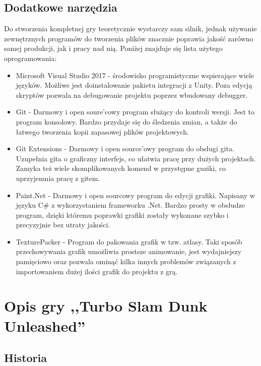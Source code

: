 \documentclass[a4paper,12pt,twoside,openany]{report}
\begin{document}
\section{Dodatkowe narzędzia}
Do stworzenia kompletnej gry teoretycznie wystarczy sam silnik, jednak używanie zewnętrznych programów do tworzenia plików znacznie poprawia jakość zarówno samej produkcji, jak i pracy nad nią. Poniżej znajduje się lista użytego oprogramowania:

\begin{itemize}
    \item Microsoft Visual Studio 2017 - środowisko programistyczne wspierające wiele języków. Możliwe jest doinstalowanie pakietu integracji z Unity. Poza edycją skryptów pozwala na debugowanie projektu poprzez wbudowany debugger.
    \item Git - Darmowy i open soure'cowy program służący do kontroli wersji. Jest to program konsolowy. Bardzo przydaje się do śledzenia zmian, a także do łatwego tworzenia kopii zapasowej plików projektowych.
    \item Git Extensions - Darmowy i open source'owy program do obsługi gita. Uzupełnia gita o graficzny interfejs, co ułatwia pracę przy dużych projektach. Zamyka też wiele skomplikowanych komend w przystępne guziki, co uprzyjemnia pracę z gitem.
    \item Paint.Net - Darmowy i open sourcowy program do edycji grafiki. Napisany w języku C\# z wykorzystaniem frameworku .Net. Bardzo prosty w obsłudze program, dzięki któremu poprawki grafiki zostały wykonane szybko i precyzyjnie bez utraty jakości.
    \item TexturePacker - Program do pakowania grafik w tzw. atlasy. Taki sposób przechowywania grafik umożliwia prostsze animowanie, jest wydajniejszy pamięciowo oraz pozwala ominąć kilka innych problemów związanych z importowaniem dużej ilości grafik do projektu z grą.
\end{itemize}

\chapter{Opis gry ,,Turbo Slam Dunk Unleashed''}

\section{Historia}
\end{document}
